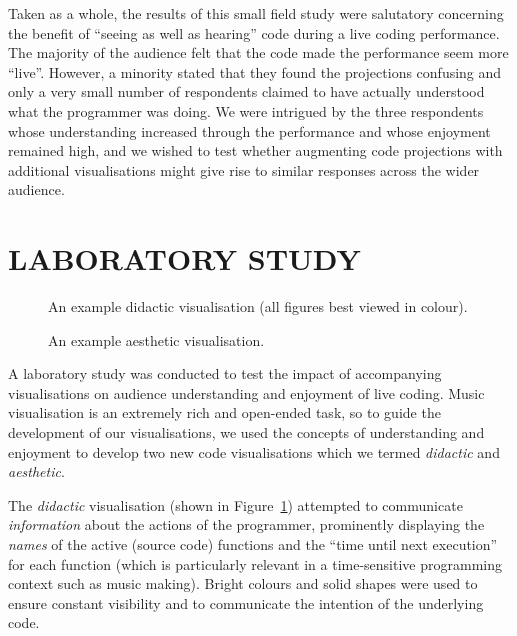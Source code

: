 \documentclass{sig-alternate}
\begin{document}
Taken as a whole, the results of this small field study were
salutatory concerning the benefit of ``seeing as well as hearing''
code during a live coding performance. The majority of the audience
felt that the code made the performance seem more ``live''. However, a
minority stated that they found the projections confusing and only a
very small number of respondents claimed to have actually understood
what the programmer was doing. We were intrigued by the three
respondents whose understanding increased through the performance and
whose enjoyment remained high, and we wished to test whether
augmenting code projections with additional visualisations might give
rise to similar responses across the wider audience.

\section*{LABORATORY STUDY}

\begin{figure}
\centering
{}
\caption{An example didactic visualisation (all
  figures best viewed in colour).}
\label{fig:didactic-visualisation}
\end{figure}

\begin{figure}
\centering
{}
\caption{An example aesthetic visualisation.}
\label{fig:aesthetic-visualisation}
\end{figure}

A laboratory study was conducted to test the impact of accompanying
visualisations on audience understanding and enjoyment of live coding.
Music visualisation is an extremely rich and open-ended task, so to
guide the development of our visualisations, we used the concepts of
understanding and enjoyment to develop two new code visualisations
which we termed \emph{didactic} and \emph{aesthetic}.

The \emph{didactic} visualisation (shown in
Figure~\ref{fig:didactic-visualisation}) attempted to communicate
\emph{information} about the actions of the programmer, prominently
displaying the \emph{names} of the active (source code) functions and
the ``time until next execution'' for each function (which is
particularly relevant in a time-sensitive programming context such as
music making). Bright colours and solid shapes were used to ensure
constant visibility and to communicate the intention of the underlying
code.
\end{document}
